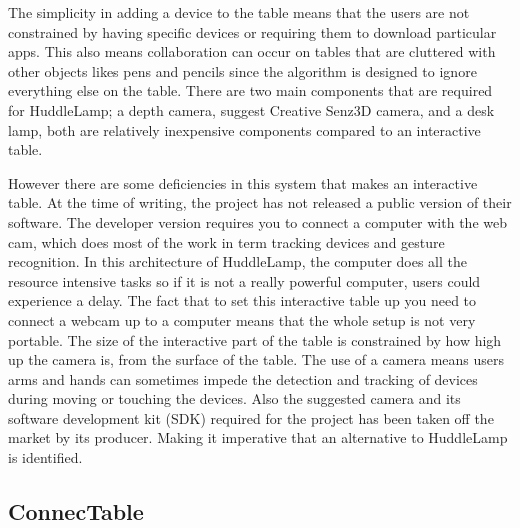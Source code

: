 The simplicity in adding a device to the table means that the users are not
constrained by having specific devices or requiring them to download
particular apps. This also means collaboration can occur on tables
that are cluttered with other objects likes pens and pencils since the algorithm is designed to ignore everything else on the table. There
are two main components that are required for HuddleLamp;
a depth camera, \citeauthor{huddlelamp-paper} suggest Creative Senz3D\cite{creative-senz3d} camera, and a desk lamp, both
are relatively inexpensive components compared to an interactive table.

However there are some deficiencies in this system that makes
an interactive table. At the time of writing, the project has not
released a public version of their software. The developer
version requires you to connect a computer with the web cam, which
does most of the work in term tracking devices and gesture recognition. In this architecture
of HuddleLamp, the computer does all the resource intensive tasks so if it is
not a really powerful computer, users could experience a delay. The fact
that to set this interactive table up you need to connect a webcam up
to a computer means that the whole setup is not very portable. The
size of the interactive part of the table is constrained by how high
up the camera is, from the surface of the table. The use of a camera
means users arms and hands can sometimes impede the
detection and tracking of devices during moving or touching the devices.
Also the suggested camera and its software development kit (SDK) required
for the project has been taken off the market by its producer. Making
it imperative that an alternative to HuddleLamp is identified.

\subsection{ConnecTable}

